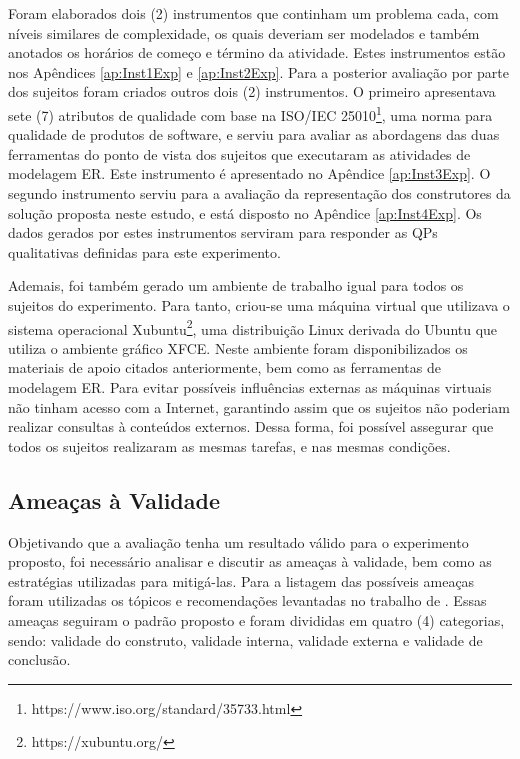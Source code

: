 Foram elaborados dois (2) instrumentos que continham um problema cada, com níveis similares de complexidade, os quais deveriam ser modelados e também anotados os horários de começo e término da atividade. 
Estes instrumentos estão nos Apêndices \ref{ap:Inst1Exp} e \ref{ap:Inst2Exp}. 
Para a posterior avaliação por parte dos sujeitos foram criados outros dois (2) instrumentos. 
O primeiro apresentava sete (7) atributos de qualidade com base na ISO/IEC 25010\footnote{https://www.iso.org/standard/35733.html}, uma norma para qualidade de produtos de software, e serviu para avaliar as abordagens das duas ferramentas do ponto de vista dos sujeitos que executaram as atividades de modelagem \ac{ER}.
Este instrumento é apresentado no Apêndice \ref{ap:Inst3Exp}.
O segundo instrumento serviu para a avaliação da representação dos construtores da solução proposta neste estudo, e está disposto no Apêndice \ref{ap:Inst4Exp}. 
Os dados gerados por estes instrumentos serviram para responder as \acp{QP} qualitativas definidas para este experimento.

Ademais, foi também gerado um ambiente de trabalho igual para todos os sujeitos do experimento. 
Para tanto, criou-se uma máquina virtual que utilizava o sistema operacional Xubuntu\footnote{https://xubuntu.org/}, uma distribuição Linux derivada do Ubuntu que utiliza o ambiente gráfico XFCE. 
Neste ambiente foram disponibilizados os materiais de apoio citados anteriormente, bem como as ferramentas de modelagem \ac{ER}. 
Para evitar possíveis influências externas as máquinas virtuais não tinham acesso com a Internet, garantindo assim que os sujeitos não poderiam realizar consultas à conteúdos externos. 
Dessa forma, foi possível assegurar que todos os sujeitos realizaram as mesmas tarefas, e nas mesmas condições.

\subsection{Ameaças à Validade} \label{ssec:validadeExp}

Objetivando que a avaliação tenha um resultado válido para o experimento proposto, foi necessário analisar e discutir as ameaças à validade, bem como as estratégias utilizadas para mitigá-las.
Para a listagem das possíveis ameaças foram utilizadas os tópicos e recomendações levantadas no trabalho de . 
Essas ameaças seguiram o padrão proposto e foram divididas em quatro (4) categorias, sendo: validade do construto, validade interna, validade externa e validade de conclusão.

